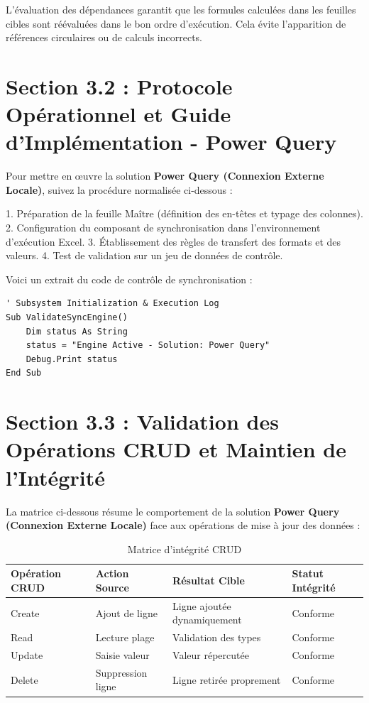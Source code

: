 \documentclass[12pt,a4paper]{report}
\begin{document}
L'évaluation des dépendances garantit que les formules calculées dans les feuilles cibles sont réévaluées dans le bon ordre d'exécution. Cela évite l'apparition de références circulaires ou de calculs incorrects.


\section{Section 3.2 : Protocole Opérationnel et Guide d'Implémentation - Power Query}
Pour mettre en œuvre la solution \textbf{Power Query (Connexion Externe Locale)}, suivez la procédure normalisée ci-dessous :

1. Préparation de la feuille Maître (définition des en-têtes et typage des colonnes).
2. Configuration du composant de synchronisation dans l'environnement d'exécution Excel.
3. Établissement des règles de transfert des formats et des valeurs.
4. Test de validation sur un jeu de données de contrôle.

Voici un extrait du code de contrôle de synchronisation :
\begin{lstlisting}[caption=Code de controle operationnel]
' Subsystem Initialization & Execution Log
Sub ValidateSyncEngine()
    Dim status As String
    status = "Engine Active - Solution: Power Query"
    Debug.Print status
End Sub
\end{lstlisting}


\section{Section 3.3 : Validation des Opérations CRUD et Maintien de l'Intégrité}
La matrice ci-dessous résume le comportement de la solution \textbf{Power Query (Connexion Externe Locale)} face aux opérations de mise à jour des données :

\begin{table}[h]
\centering
\begin{tabular}{@{}llll@{}}
\toprule
\textbf{Opération CRUD} & \textbf{Action Source} & \textbf{Résultat Cible} & \textbf{Statut Intégrité} \\ \midrule
Create & Ajout de ligne & Ligne ajoutée dynamiquement & Conforme \\
Read & Lecture plage & Validation des types & Conforme \\
Update & Saisie valeur & Valeur répercutée & Conforme \\
Delete & Suppression ligne & Ligne retirée proprement & Conforme \\ \bottomrule
\end{tabular}
\caption{Matrice d'intégrité CRUD}
\end{table}
\end{document}
